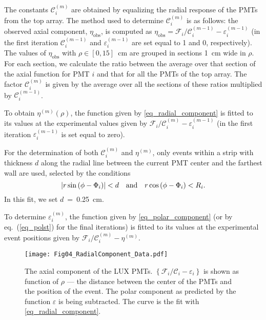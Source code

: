 \documentclass[a4paper,11pt]{article}
\begin{document}
The constants $\mathcal{C}_i^{(m)}$ are obtained by equalizing the radial response of the PMTs from the top array. The method used to determine $\mathcal{C}_i^{(m)}$ is as follows: the observed axial component, $\eta_{\mathrm {obs}}$,  is computed as $\eta_{\mathrm {obs}} = \mathcal{F}_i/\mathcal{C}_i^{(m-1)} - \varepsilon_i^{(m-1)}$ (in the first iteration $\mathcal{C}_i^{(m-1)}$ and $\mathcal{\varepsilon}_i^{(m-1)}$ are set equal to 1 and 0, respectively). The values of $\eta_{\mathrm {obs}}$ with $\rho\in[0,15]$~cm are grouped in sections 1~cm wide in $\rho$. For each section, we calculate the ratio between the average over that section of the axial function for PMT $i$ and that for all the PMTs of the top array. The factor $\mathcal{C}_i^{(m)}$ is given by the average over all the sections of these ratios multiplied by $\mathcal{C}_i^{(m-1)}$. 

To obtain $\eta^{(m)}\left(\rho\right)$, the function given by \cref{eq_radial_component} is fitted to its values at the experimental { values} given by $\mathcal{F}_i/\mathcal{C}_i^{(m)} - \varepsilon_i^{(m-1)}$ (in the first iteration $\varepsilon_i^{(m-1)}$ is set equal to zero). 

For the determination of both $\mathcal{C}_i^{(m)}$ and $\mathcal{\eta}^{(m)}$, only events within a strip with thickness $d$ along the radial line between the current PMT center and the farthest wall are used, selected by the conditions
\begin{equation}
\left|r\sin\left(\phi - \Phi_i\right)\right| < d \quad {\rm{and}} \quad   r\cos\left(\phi - \Phi_i\right) < R_i.
\label{SelectionCondition}
\end{equation}
In this fit, we set $d$~=~0.25~cm.

To determine $\varepsilon_i^{(m)}$, the function given by \cref{eq_polar_component} (or by eq.\ (\ref{eq_polst}) for the final iterations) is fitted to its values at the experimental event positions given by $\mathcal{F}_i/\mathcal{C}_i^{(m)} - \eta^{(m)}$. 

\begin{figure}
 \begin{center}
  \texttt{[image: Fig04\_RadialComponent\_Data.pdf]}
  \caption{The axial component of the LUX PMTs. $\left\{\mathcal{F}_i/\mathcal{C}_i - \varepsilon_i\right\}$  is shown as function of $\rho$ --- the distance between the center of the PMTs and the position of the event. The polar component as predicted by the function $\varepsilon$ is being subtracted. The curve is the fit with  \cref{eq_radial_component}.}
  \label{Fig06_RadialComponent_Data}
 \end{center}
\end{figure}
\end{document}
